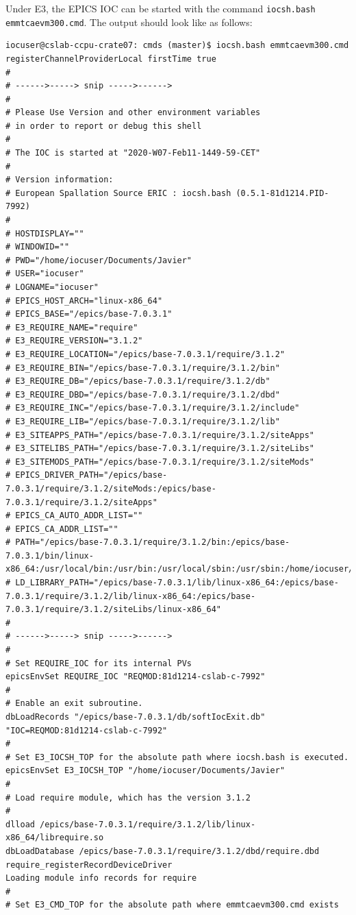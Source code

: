\documentclass[11pt
  , a4paper
  , article
  , oneside
  , showtrims
]{memoir}
\begin{document}
Under E3, the EPICS IOC can be started with the command \texttt{iocsh.bash emmtcaevm300.cmd}. The output should look like as follows:
\begin{lstlisting}[style=termstyle]
iocuser@cslab-ccpu-crate07: cmds (master)$ iocsh.bash emmtcaevm300.cmd
registerChannelProviderLocal firstTime true
#
# ------>-----> snip ----->------>
#
# Please Use Version and other environment variables
# in order to report or debug this shell
#
# The IOC is started at "2020-W07-Feb11-1449-59-CET"
#
# Version information:
# European Spallation Source ERIC : iocsh.bash (0.5.1-81d1214.PID-7992)
#
# HOSTDISPLAY=""
# WINDOWID=""
# PWD="/home/iocuser/Documents/Javier"
# USER="iocuser"
# LOGNAME="iocuser"
# EPICS_HOST_ARCH="linux-x86_64"
# EPICS_BASE="/epics/base-7.0.3.1"
# E3_REQUIRE_NAME="require"
# E3_REQUIRE_VERSION="3.1.2"
# E3_REQUIRE_LOCATION="/epics/base-7.0.3.1/require/3.1.2"
# E3_REQUIRE_BIN="/epics/base-7.0.3.1/require/3.1.2/bin"
# E3_REQUIRE_DB="/epics/base-7.0.3.1/require/3.1.2/db"
# E3_REQUIRE_DBD="/epics/base-7.0.3.1/require/3.1.2/dbd"
# E3_REQUIRE_INC="/epics/base-7.0.3.1/require/3.1.2/include"
# E3_REQUIRE_LIB="/epics/base-7.0.3.1/require/3.1.2/lib"
# E3_SITEAPPS_PATH="/epics/base-7.0.3.1/require/3.1.2/siteApps"
# E3_SITELIBS_PATH="/epics/base-7.0.3.1/require/3.1.2/siteLibs"
# E3_SITEMODS_PATH="/epics/base-7.0.3.1/require/3.1.2/siteMods"
# EPICS_DRIVER_PATH="/epics/base-7.0.3.1/require/3.1.2/siteMods:/epics/base-7.0.3.1/require/3.1.2/siteApps"
# EPICS_CA_AUTO_ADDR_LIST=""
# EPICS_CA_ADDR_LIST=""
# PATH="/epics/base-7.0.3.1/require/3.1.2/bin:/epics/base-7.0.3.1/bin/linux-x86_64:/usr/local/bin:/usr/bin:/usr/local/sbin:/usr/sbin:/home/iocuser/.local/bin:/home/iocuser/bin"
# LD_LIBRARY_PATH="/epics/base-7.0.3.1/lib/linux-x86_64:/epics/base-7.0.3.1/require/3.1.2/lib/linux-x86_64:/epics/base-7.0.3.1/require/3.1.2/siteLibs/linux-x86_64"
#
# ------>-----> snip ----->------>
#
# Set REQUIRE_IOC for its internal PVs
epicsEnvSet REQUIRE_IOC "REQMOD:81d1214-cslab-c-7992"
#
# Enable an exit subroutine.
dbLoadRecords "/epics/base-7.0.3.1/db/softIocExit.db" "IOC=REQMOD:81d1214-cslab-c-7992"
#
# Set E3_IOCSH_TOP for the absolute path where iocsh.bash is executed.
epicsEnvSet E3_IOCSH_TOP "/home/iocuser/Documents/Javier"
#
# Load require module, which has the version 3.1.2
#
dlload /epics/base-7.0.3.1/require/3.1.2/lib/linux-x86_64/librequire.so
dbLoadDatabase /epics/base-7.0.3.1/require/3.1.2/dbd/require.dbd
require_registerRecordDeviceDriver
Loading module info records for require
#
# Set E3_CMD_TOP for the absolute path where emmtcaevm300.cmd exists

\end{lstlisting}
\end{document}
